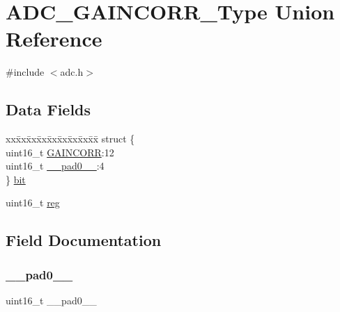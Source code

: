 \hypertarget{union_a_d_c___g_a_i_n_c_o_r_r___type}{}\section{A\+D\+C\+\_\+\+G\+A\+I\+N\+C\+O\+R\+R\+\_\+\+Type Union Reference}
\label{union_a_d_c___g_a_i_n_c_o_r_r___type}


{\ttfamily \#include $<$adc.\+h$>$}

\subsection*{Data Fields}
\begin{DoxyCompactItemize}
\item 
\begin{tabbing}
xx\=xx\=xx\=xx\=xx\=xx\=xx\=xx\=xx\=\kill
struct \{\\
\>uint16\_t \mbox{\hyperlink{union_a_d_c___g_a_i_n_c_o_r_r___type_a8c89a5e0f788ce02b3236a5501a34c53}{GAINCORR}}:12\\
\>uint16\_t \mbox{\hyperlink{union_a_d_c___g_a_i_n_c_o_r_r___type_a77132c2c26a75f5b8751b235cda23828}{\_\_pad0\_\_}}:4\\
\} \mbox{\hyperlink{union_a_d_c___g_a_i_n_c_o_r_r___type_a95050ada4d2143926cbf1eb10120a417}{bit}}\\

\end{tabbing}\item 
uint16\+\_\+t \mbox{\hyperlink{union_a_d_c___g_a_i_n_c_o_r_r___type_a11760f5020019f4aa8cb02e694f7cc44}{reg}}
\end{DoxyCompactItemize}


\subsection{Field Documentation}
\mbox{\label{union_a_d_c___g_a_i_n_c_o_r_r___type_a77132c2c26a75f5b8751b235cda23828}} 
\subsubsection{\texorpdfstring{\_\_pad0\_\_}{\_\_pad0\_\_}}
{\footnotesize\ttfamily uint16\+\_\+t \+\_\+\+\_\+pad0\+\_\+\+\_\+}

